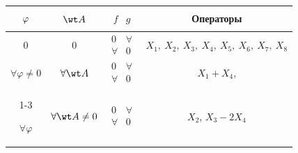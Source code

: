 \begin{center} 


\begin{tabular}{|c|c|c|c|} 


\hline 


$\myrule\varphi$& $\wt A$& $\begin{matrix}f & g\end{matrix}$ & Операторы \\ 


\hline 


%


0 & 0 & $\begin{matrix} 0 & \forall \\ \forall & 0\end{matrix}$ &


$X_1,\ X_2,\ X_3,\ X_4,\  X_5,\ X_6,\ X_7,\ X_8$ \\


\hline


%


$\forall\varphi\ne0$ & $\forall\wt A$ &


$\begin{matrix} 0 & \forall \\ \forall & 0\end{matrix}$


& $X_1+X_4$, \\


\cline{1-3}


$\forall\varphi$ & $\forall\wt A\ne 0$ &


$\begin{matrix} 0 & \forall \\ \forall & 0\end{matrix}$


& $X_2$, $X_3-2X_4$ \\


\hline


\end{tabular} 


\end{center} 





